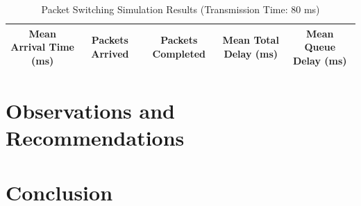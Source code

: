 \documentclass{article}
\begin{document}
  \begin{table}[h]
    \caption{Packet Switching Simulation Results (Transmission Time: 80 ms)}
    \centering
    {\footnotesize
      \begin{tabular}{|c|c|c|c|c|}
        \hline
          Mean Arrival Time (ms) & Packets Arrived & Packets Completed & Mean Total Delay (ms)
          & Mean Queue Delay (ms)\\
        \hline
      \end{tabular}
    }
  \end{table}

  \section{Observations and Recommendations}



  \section{Conclusion}
\end{document}
